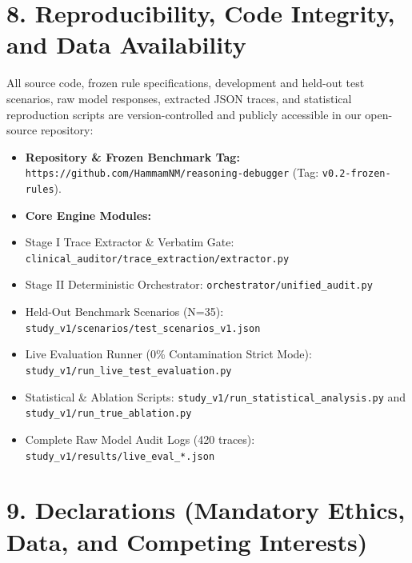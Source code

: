 \documentclass[10pt,a4paper]{article}
\begin{document}
\section*{8. Reproducibility, Code Integrity, and Data Availability}

All source code, frozen rule specifications, development and held-out test scenarios, raw model responses, extracted JSON traces, and statistical reproduction scripts are version-controlled and publicly accessible in our open-source repository:
\begin{itemize}
  \item \textbf{Repository \& Frozen Benchmark Tag:} \texttt{https://github.com/HammamNM/reasoning-debugger} (Tag: \texttt{v0.2-frozen-rules}).
  \item \textbf{Core Engine Modules:}
  \item Stage I Trace Extractor \& Verbatim Gate: \texttt{clinical\_auditor/trace\_extraction/extractor.py}
  \item Stage II Deterministic Orchestrator: \texttt{orchestrator/unified\_audit.py}
  \item Held-Out Benchmark Scenarios (N=35): \texttt{study\_v1/scenarios/test\_scenarios\_v1.json}
  \item Live Evaluation Runner (0\% Contamination Strict Mode): \texttt{study\_v1/run\_live\_test\_evaluation.py}
  \item Statistical \& Ablation Scripts: \texttt{study\_v1/run\_statistical\_analysis.py} and \texttt{study\_v1/run\_true\_ablation.py}
  \item Complete Raw Model Audit Logs (420 traces): \texttt{study\_v1/results/live\_eval\_*.json}
\end{itemize}



\section*{9. Declarations (Mandatory Ethics, Data, and Competing Interests)}
\end{document}
